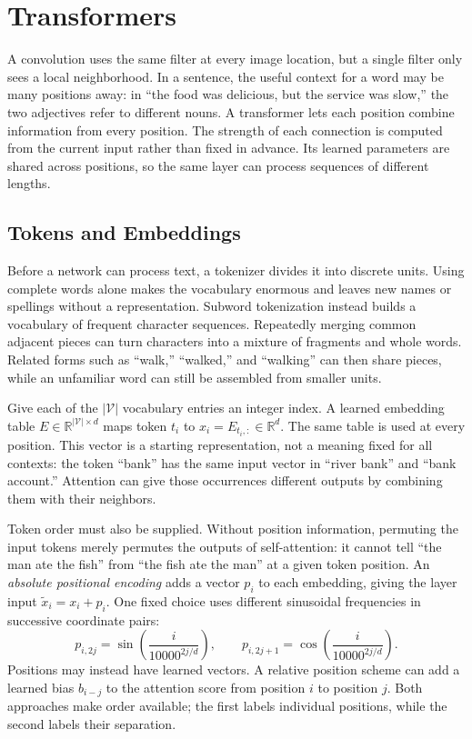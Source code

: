 \section{Transformers}
\label{sec:transformers}

A convolution uses the same filter at every image location, but a single filter
only sees a local neighborhood. In a sentence, the useful context for a word may
be many positions away: in ``the food was delicious, but the service was slow,''
the two adjectives refer to different nouns. A transformer lets each position
combine information from every position. The strength of each connection is
computed from the current input rather than fixed in advance. Its learned
parameters are shared across positions, so the same layer can process sequences
of different lengths.

\subsection{Tokens and Embeddings}

Before a network can process text, a tokenizer divides it into discrete units.
Using complete words alone makes the vocabulary enormous and leaves new names or
spellings without a representation. Subword tokenization instead builds a
vocabulary of frequent character sequences. Repeatedly merging common adjacent
pieces can turn characters into a mixture of fragments and whole words. Related
forms such as ``walk,'' ``walked,'' and ``walking'' can then share pieces, while
an unfamiliar word can still be assembled from smaller units.

Give each of the $|\mathcal V|$ vocabulary entries an integer index. A learned
embedding table $E\in\mathbb R^{|\mathcal V|\times d}$ maps token $t_i$ to
$x_i=E_{t_i,:}\in\mathbb R^d$. The same table is used at every position. This
vector is a starting representation, not a meaning fixed for all contexts: the
token ``bank'' has the same input vector in ``river bank'' and ``bank account.''
Attention can give those occurrences different outputs by combining them with
their neighbors.

Token order must also be supplied. Without position information, permuting the
input tokens merely permutes the outputs of self-attention: it cannot tell ``the
man ate the fish'' from ``the fish ate the man'' at a given token position.
An \emph{absolute positional encoding} adds a vector $p_i$ to each embedding,
giving the layer input $\tilde x_i=x_i+p_i$. One fixed choice uses different
sinusoidal frequencies in successive coordinate pairs:
\begin{equation}
  p_{i,2j}=\sin\!\left(\frac{i}{10000^{2j/d}}\right),\qquad
  p_{i,2j+1}=\cos\!\left(\frac{i}{10000^{2j/d}}\right).
  \label{eq:transformer-position}
\end{equation}
\noindent
Positions may instead have learned vectors. A relative position scheme can add
a learned bias $b_{i-j}$ to the attention score from position $i$ to position
$j$. Both approaches make order available; the first labels individual
positions, while the second labels their separation.

